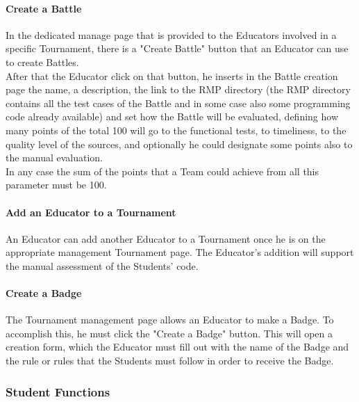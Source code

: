 \paragraph{Create a Battle}
In the dedicated manage page that is provided to the Educators involved in a specific Tournament, there is a "Create Battle" button that an Educator can use to create Battles.\\
After that the Educator click on that button, he inserts in the Battle creation page the name, a description, the link to the RMP directory (the RMP directory contains all the test cases of the Battle
and in some case also some programming code already available) and set how the Battle will be evaluated, defining how many points of the total 100 will go to the functional tests, to timeliness, to 
the quality level of the sources, and optionally he could designate some points also to the manual evaluation.\\
In any case the sum of the points that a Team could achieve from all this parameter must be 100.
\paragraph{Add an Educator to a Tournament}
An Educator can add another Educator to a Tournament once he is on the appropriate management Tournament page. The Educator's addition will support the manual assessment of the Students' code.
\paragraph{Create a Badge}
The Tournament management page allows an Educator to make a Badge. To accomplish this, he must click the "Create a Badge" button. This will open a creation form, which the Educator must fill out with the name of the Badge and the rule 
or rules that the Students must follow in order to receive the Badge.

\subsubsection{Student Functions}
